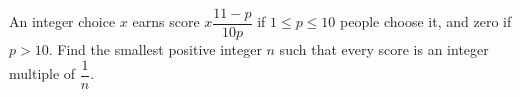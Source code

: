 An integer choice $x$ earns score $x\dfrac{11-p}{10p}$ if $1\le p\le10$ people choose it, and zero if $p>10$. Find the smallest positive integer $n$ such that every score is an integer multiple of $\dfrac{1}{n}$.

